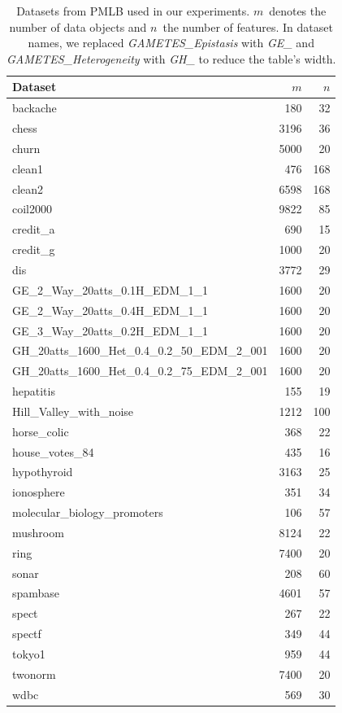 \documentclass{article}
\theoremstyle{definition}
\begin{document}
\begin{table}[p]
	\centering
	\caption{
		Datasets from PMLB used in our experiments.
		$m$~denotes the number of data objects and $n$~the number of features.
		In dataset names, we replaced \emph{GAMETES\_Epistasis} with \emph{GE\_} and \emph{GAMETES\_Heterogeneity} with \emph{GH\_} to reduce the table's width.
	}
	\begin{tabular}{lrr}
		\toprule
		Dataset & $m$ & $n$ \\
		\midrule
		backache & 180 & 32 \\
		chess & 3196 & 36 \\
		churn & 5000 & 20 \\
		clean1 & 476 & 168 \\
		clean2 & 6598 & 168 \\
		coil2000 & 9822 & 85 \\
		credit\_a & 690 & 15 \\
		credit\_g & 1000 & 20 \\
		dis & 3772 & 29 \\
		GE\_2\_Way\_20atts\_0.1H\_EDM\_1\_1 & 1600 & 20 \\
		GE\_2\_Way\_20atts\_0.4H\_EDM\_1\_1 & 1600 & 20 \\
		GE\_3\_Way\_20atts\_0.2H\_EDM\_1\_1 & 1600 & 20 \\
		GH\_20atts\_1600\_Het\_0.4\_0.2\_50\_EDM\_2\_001 & 1600 & 20 \\
		GH\_20atts\_1600\_Het\_0.4\_0.2\_75\_EDM\_2\_001 & 1600 & 20 \\
		hepatitis & 155 & 19 \\
		Hill\_Valley\_with\_noise & 1212 & 100 \\
		horse\_colic & 368 & 22 \\
		house\_votes\_84 & 435 & 16 \\
		hypothyroid & 3163 & 25 \\
		ionosphere & 351 & 34 \\
		molecular\_biology\_promoters & 106 & 57 \\
		mushroom & 8124 & 22 \\
		ring & 7400 & 20 \\
		sonar & 208 & 60 \\
		spambase & 4601 & 57 \\
		spect & 267 & 22 \\
		spectf & 349 & 44 \\
		tokyo1 & 959 & 44 \\
		twonorm & 7400 & 20 \\
		wdbc & 569 & 30 \\
		\bottomrule
	\end{tabular}
	\label{tab:afs:datasets}
\end{table}
\end{document}
